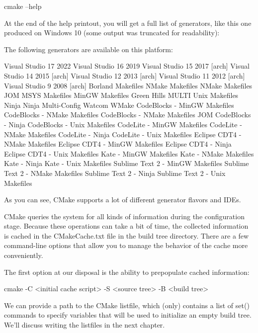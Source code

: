 \begin{shell}
cmake --help
\end{shell}

At the end of the help printout, you will get a full list of generators, like this one produced on Windows 10 (some output was truncated for readability):

 The following generators are available on this platform:

\begin{shell}
Visual Studio 17 2022
Visual Studio 16 2019
Visual Studio 15 2017 [arch]
Visual Studio 14 2015 [arch]
Visual Studio 12 2013 [arch]
Visual Studio 11 2012 [arch]
Visual Studio 9 2008 [arch]
Borland Makefiles
NMake Makefiles
NMake Makefiles JOM
MSYS Makefiles
MinGW Makefiles
Green Hills MULTI
Unix Makefiles
Ninja
Ninja Multi-Config
Watcom WMake
CodeBlocks - MinGW Makefiles
CodeBlocks - NMake Makefiles
CodeBlocks - NMake Makefiles JOM
CodeBlocks - Ninja
CodeBlocks - Unix Makefiles
CodeLite - MinGW Makefiles
CodeLite - NMake Makefiles
CodeLite - Ninja
CodeLite - Unix Makefiles
Eclipse CDT4 - NMake Makefiles
Eclipse CDT4 - MinGW Makefiles
Eclipse CDT4 - Ninja
Eclipse CDT4 - Unix Makefiles
Kate - MinGW Makefiles
Kate - NMake Makefiles
Kate - Ninja
Kate - Unix Makefiles
Sublime Text 2 - MinGW Makefiles
Sublime Text 2 - NMake Makefiles
Sublime Text 2 - Ninja
Sublime Text 2 - Unix Makefiles
\end{shell}

As you can see, CMake supports a lot of different generator flavors and IDEs.


CMake queries the system for all kinds of information during the configuration stage. Because these operations can take a bit of time, the collected information is cached in the CMakeCache.txt file in the build tree directory. There are a few command-line options that allow you to manage the behavior of the cache more conveniently.

The first option at our disposal is the ability to prepopulate cached information:

\begin{shell}
cmake -C <initial cache script> -S <source tree> -B <build tree>
\end{shell}

We can provide a path to the CMake listfile, which (only) contains a list of set() commands to specify variables that will be used to initialize an empty build tree. We’ll discuss writing the listfiles in the next chapter.

